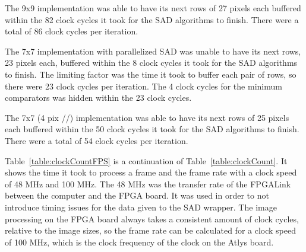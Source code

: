 The 9x9 implementation was able to have its next rows of 27 pixels each buffered within the 82 clock cycles it took for the SAD algorithms to finish. There were a total of 86 clock cycles per iteration.

The 7x7 implementation with parallelized SAD was unable to have its next rows, 23 pixels each, buffered within the 8 clock cycles it took for the SAD algorithms to finish. The limiting factor was the time it took to buffer each pair of rows, so there were 23 clock cycles per iteration. The 4 clock cycles for the minimum comparators was hidden within the 23 clock cycles.

The 7x7 (4 pix //) implementation was able to have its next rows of 25 pixels each buffered within the 50 clock cycles it took for the SAD algorithms to finish. There were a total of 54 clock cycles per iteration.

Table~\ref{table:clockCountFPS} is a continuation of Table~\ref{table:clockCount}. It shows the time it took to process a frame and the frame rate with a clock speed of 48 MHz and 100 MHz. The 48 MHz was the transfer rate of the FPGALink between the computer and the FPGA board. It was used in order to not introduce timing issues for the data given to the SAD wrapper. The image processing on the FPGA board always takes a consistent amount of clock cycles, relative to the image sizes, so the frame rate can be calculated for a clock speed of 100 MHz, which is the clock frequency of the clock on the Atlys board.\\\\\\\\\\

